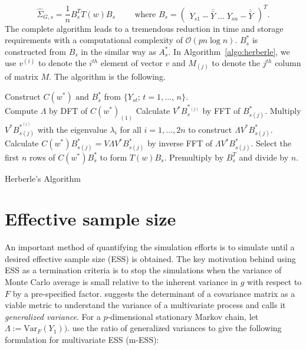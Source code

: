 \documentclass[11pt]{article}
\newcommand{\Var}{\text{Var}}
\theoremstyle{remark}
\begin{document}
\[
\hat{\Sigma}_{G,s} = \dfrac{1}{n}B_s^T T(w) B_s \qquad \textrm{ where } B_s = 
\begin{pmatrix}
    Y_{s1} - \bar{\bar{Y}} \; \dots \; Y_{sn} - \bar{\bar{Y}}\end{pmatrix}^T.
\]
The complete algorithm leads to a tremendous reduction in time and storage requirements with a computational complexity of $\mathcal{O}(p n \log n)$. $B_s^*$ is constructed from $B_s$ in the similar way as $A_s^*$. In Algorithm~\ref{algo:herberle}, we use $v^{(i)}$ to denote the $i^{th}$ element of vector $v$ and $M_{(j)}$ to denote the $j^{th}$ column of matrix $M$. The algorithm is the following.

\begin{algorithm}[htbp] 
\DontPrintSemicolon
\SetAlgoLined
Construct $C(w^*) \textrm{ and } B_s^*$ from $\{Y_{st};\, t = 1, ...,\, n\}$.\\ 
Compute $\Lambda$ by DFT of $C(w^*)_{(1)}$\;
    { 
    Calculate $V^*B_s^{*_{(j)}}$ by FFT of $B^*_{s(j)}$.\;
    Multiply $V^* B_{s(j)}^{*^{(i)}}$ with the eigenvalue $\lambda_i$ for all $i = 1, ..., 2n$ to construct $\Lambda V^* B_{s(j)}^*$.\;
    Calculate $C(w^*)B^*_{s(j)} = V \Lambda V^* B_{s(j)}^*$ by inverse FFT of $\Lambda V^* B_{s(j)}^*$.\;
    }
 Select the first $n$ rows of $C(w^*)B^*_s$ to form $T(w)B_s$.\;
 Premultiply by $B_s^T$ and divide by $n$.
 \caption{Herberle's Algorithm}
 \label{algo:herberle}
\end{algorithm}


\section{Effective sample size} \label{sec:ess}

An important method of quantifying the simulation efforts is to simulate until a desired effective sample size (ESS) is obtained. The key motivation behind using ESS as a termination criteria is to stop the simulations when the variance of Monte Carlo average is small relative to the inherent variance in $g$ with respect to $F$ by a pre-specified factor. \cite{wilks:1932} suggests the determinant of a covariance matrix as a viable metric to understand the variance of a multivariate process and calls it \textit{generalized variance}. For a $p$-dimensional stationary Markov chain, let $\Lambda := \Var_F(Y_1))$. \cite{vats2019multivariate} use the ratio of generalized variances to give the following formulation for multivariate ESS (m-ESS):
\end{document}
